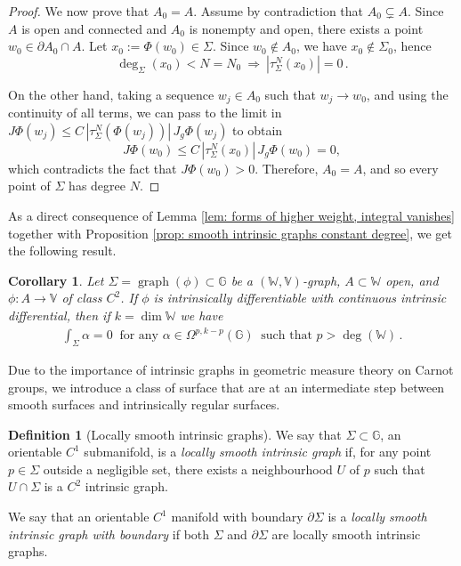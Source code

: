 \documentclass[dvipsnames]{amsart}
\newtheorem{corollary}[theorem]{Corollary}
\theoremstyle{definition}
\newtheorem{definition}[theorem]{Definition}
\theoremstyle{definition}
\numberwithin{equation}{section}
\newcommand{\W}{\mathbb{W}}
\newcommand{\V}{\mathbb{V}}
\newcommand{\G}{\mathbb{G}}
\begin{document}
\begin{proof}
We now prove that $A_0= A$. Assume by contradiction that $A_0 \subsetneq A$. Since $A$ is open and connected and $A_0$ is nonempty and open, there exists a point $w_0 \in \partial A_0 \cap A$.
Let $x_0 := \Phi(w_0) \in \Sigma$. Since $w_0 \notin A_0$, we have $x_0 \notin \Sigma_0$, hence
\[
\operatorname{deg}_\Sigma(x_0) < N = N_0\ \Longrightarrow\ 
|\tau_\Sigma^N(x_0)| = 0\,.
\]

On the other hand, taking a sequence $w_j \in A_0$ such that $w_j \to w_0$, and using the continuity of all terms, we can pass to the limit in $J\Phi(w_j) \le C\, |\tau_\Sigma^N(\Phi(w_j))| \, J_g\Phi(w_j)$
to obtain
\[
J\Phi(w_0) \le C\, |\tau_\Sigma^N(x_0)| \, J_g\Phi(w_0) = 0,
\]
which contradicts the fact that $J\Phi(w_0) > 0$.
Therefore, $A_0 = A$, and so every point of $\Sigma$ has degree $N$.
\end{proof}
As a direct consequence of Lemma \ref{lem: forms of higher weight, integral vanishes} together with Proposition \ref{prop: smooth intrinsic graphs constant degree}, we get the following result.
\begin{corollary}\label{cor: integrating forms on smooth intrinsic graphs}Let $\Sigma=\operatorname{graph}(\phi)\subset\G$ be a $(\W,\V)$-graph, $A\subset\W$ open, and $\phi\colon A\to\V$ of class $C^2$. If $\phi$ is intrinsically differentiable with continuous intrinsic differential, then if $k=\operatorname{dim}\W$ we have
\begin{align*}
    \int_\Sigma\alpha=0\ \text{ for any }\alpha\in\Omega^{p,k-p}(\G)\ \text{ such that }p>\operatorname{deg}(\W)\,.
\end{align*}
    
\end{corollary}

Due to the importance of intrinsic graphs in geometric measure theory on Carnot groups, we introduce a class of surface that are at an intermediate step between smooth surfaces and intrinsically regular surfaces.
\begin{definition}[Locally smooth intrinsic graphs]\label{def:LSIG}
We say that $\Sigma\subset\G$, an orientable $C^1$ submanifold, is a \textit{locally smooth intrinsic graph} if, for any point $p\in\Sigma$ outside a negligible set, there exists a neighbourhood $U$ of $p$ such that $U\cap\Sigma$ is a $C^2$ intrinsic graph.

We say that an orientable $C^1$ manifold with boundary $\partial\Sigma$ is a \textit{locally smooth intrinsic graph with boundary} if both $\Sigma$ and $\partial\Sigma$ are locally smooth intrinsic graphs.


\end{definition}
\end{document}
